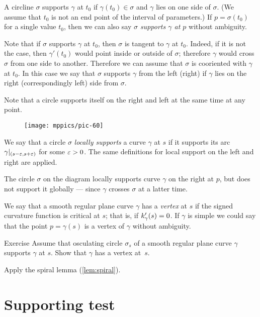A circline $\sigma$ supports $\gamma$ at $t_0$ if $\gamma(t_0)\in\sigma$
and $\gamma$ lies on one side of $\sigma$.
(We assume that $t_0$ is not an end point of the interval of parameters.)
If $p=\sigma(t_0)$ for a single value $t_0$,
then we can also say \emph{$\sigma$ supports $\gamma$ at $p$} without ambiguity.

Note that if $\sigma$ supports $\gamma$ at $t_0$, then $\sigma$ is tangent to $\gamma$ at $t_0$.
Indeed, if it is not the case, then $\gamma'(t_0)$ would point inside or outside of $\sigma$;
therefore $\gamma$ would cross $\sigma$ from one side to another.
Therefore we can assume that $\sigma$ is cooriented with $\gamma$  at $t_0$.
In this case we say that $\sigma$ supports $\gamma$ from the left (right) if $\gamma$ lies on the right (correspondingly left) side from $\sigma$. 


Note that a circle supports itself on the right and left at the same time at any point.

{

\begin{wrapfigure}{o}{43 mm}
\vskip0mm
\centering
\texttt{[image: mppics/pic-60]}
\vskip0mm
\end{wrapfigure}

We say that a circle $\sigma$ \emph{locally supports} a curve $\gamma$ at $s$
if it supports its arc $\gamma|_{(s-\varepsilon,s+\varepsilon)}$ for some $\varepsilon>0$.
The same definitions for local support on the left and right are applied.

The circle $\sigma$ on the diagram locally supports curve $\gamma$ on the right at $p$, but does not support it globally --- since $\gamma$ crosses $\sigma$ at a latter time.

}

We say that a smooth regular plane curve $\gamma$ has a \emph{vertex} at $s$
if the signed curvature function is critical at $s$;
that is, if $k'_\gamma(s)=0$.
If $\gamma$ is simple we could say that the point $p=\gamma(s)$ is a vertex of $\gamma$ without ambiguity.

\begin{thm}{Exercise}\label{ex:vertex-support}
Assume that osculating circle $\sigma_s$ of a smooth regular plane curve $\gamma$ supports $\gamma$ at $s$.
Show that $\gamma$ has a vertex at~$s$.
\end{thm}

 Apply the spiral lemma (\ref{lem:spiral}).

\section*{Supporting test}

